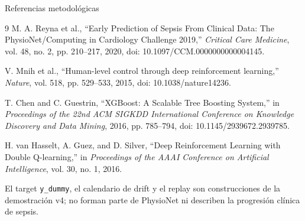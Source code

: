 \documentclass[aspectratio=169,10pt]{beamer}
\begin{document}
\begin{frame}[allowframebreaks]{Referencias metodológicas}
\footnotesize
\begin{thebibliography}{9}
M. A. Reyna et al., ``Early Prediction of Sepsis From Clinical Data: The
PhysioNet/Computing in Cardiology Challenge 2019,''
\emph{Critical Care Medicine}, vol. 48, no. 2, pp. 210--217, 2020,
doi: 10.1097/CCM.0000000000004145.

V. Mnih et al., ``Human-level control through deep reinforcement learning,''
\emph{Nature}, vol. 518, pp. 529--533, 2015,
doi: 10.1038/nature14236.

T. Chen and C. Guestrin, ``XGBoost: A Scalable Tree Boosting System,''
in \emph{Proceedings of the 22nd ACM SIGKDD International Conference on
Knowledge Discovery and Data Mining}, 2016, pp. 785--794,
doi: 10.1145/2939672.2939785.

H. van Hasselt, A. Guez, and D. Silver, ``Deep Reinforcement Learning with
Double Q-learning,'' in \emph{Proceedings of the AAAI Conference on
Artificial Intelligence}, vol. 30, no. 1, 2016.

El target \texttt{y\_dummy}, el calendario de drift y el replay son
construcciones de la demostración v4; no forman parte de PhysioNet ni describen
la progresión clínica de sepsis.
\end{thebibliography}
\end{frame}
\end{document}
